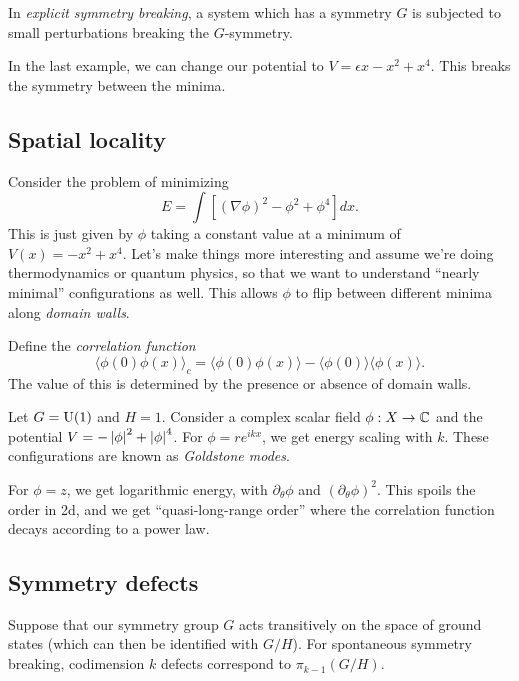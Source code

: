 In \emph{explicit symmetry breaking}, a system which has a symmetry $G$ is subjected to small perturbations breaking the $G$-symmetry.

\begin{ex}
	In the last example, we can change our potential to $V = \epsilon x - x^2 + x^4$.
	This breaks the symmetry between the minima.
\end{ex}

\subsection{Spatial locality}

\begin{ex}
	Consider the problem of minimizing
	\[
		E = \int [(\nabla \phi)^2 - \phi^2 + \phi^4] dx.
	\]
	This is just given by $\phi$ taking a constant value at a minimum of $V(x) = -x^2 + x^4$.
	Let's make things more interesting and assume we're doing thermodynamics or quantum physics, so that we want to understand ``nearly minimal'' configurations as well.
	This allows $\phi$ to flip between different minima along \emph{domain walls}.
\end{ex}

Define the \emph{correlation function}
\[
	\langle \phi(0) \phi(x) \rangle_c = \langle \phi(0) \phi(x) \rangle - \langle \phi(0) \rangle \langle \phi(x) \rangle.
\]
The value of this is determined by the presence or absence of domain walls.

\begin{ex}
	Let $G = \mathrm{U}(1)$ and $H = 1$.
	Consider a complex scalar field $\phi: X \to \mathbb{C}$ and the potential $V = -\left|{\phi}\right|^2 + \left|{\phi}\right|^4$.
	For $\phi = re^{ikx}$, we get energy scaling with $k$.
	These configurations are known as \emph{Goldstone modes}.

	For $\phi = z$, we get logarithmic energy, with $\partial_\theta \phi$ and $(\partial_\theta \phi)^2$.
	This spoils the order in 2d, and we get ``quasi-long-range order'' where the correlation function decays according to a power law.
\end{ex}

\subsection{Symmetry defects}

Suppose that our symmetry group $G$ acts transitively on the space of ground states (which can then be identified with $G / H$).
For spontaneous symmetry breaking, codimension $k$ defects correspond to $\pi_{k-1}(G / H)$.

